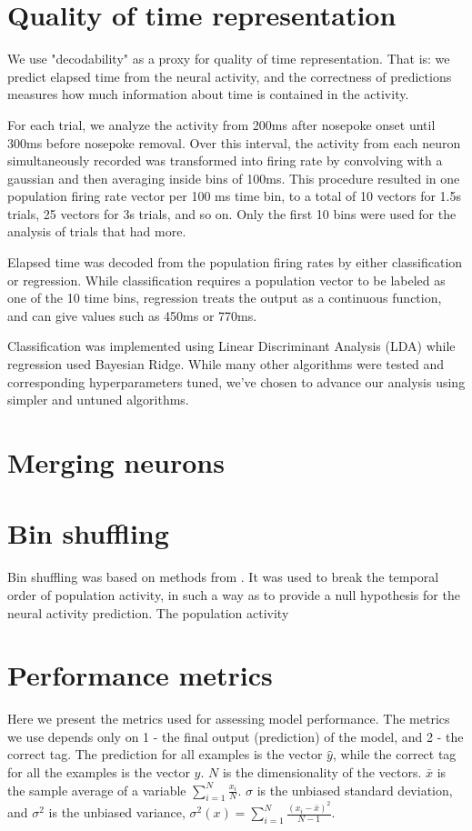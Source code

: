 \section{Quality of time representation}

    We use "decodability" as a proxy for quality of time representation. That is: we predict elapsed time from the neural activity, and the correctness of predictions measures how much information about time is contained in the activity. 
    
    For each trial, we analyze the activity from 200ms after nosepoke onset until 300ms before nosepoke removal. Over this interval, the activity from each neuron simultaneously recorded was transformed into firing rate by convolving with a gaussian and then averaging inside bins of 100ms. This procedure resulted in one population firing rate vector per 100 ms time bin, to a total of 10 vectors for 1.5s trials, 25 vectors for 3s trials, and so on. Only the first 10 bins were used for the analysis of trials that had more. 
    
    Elapsed time was decoded from the population firing rates by either classification or regression. While classification requires a population vector to be labeled as one of the 10 time bins, regression treats the output as a continuous function, and can give values such as 450ms or 770ms. 

    Classification was implemented using Linear Discriminant Analysis (LDA) while regression used Bayesian Ridge. While many other algorithms were tested and corresponding hyperparameters tuned, we've chosen to advance our analysis using simpler and untuned algorithms. 

\section{Merging neurons}
    
\section{Bin shuffling}
    Bin shuffling was based on methods from \cite{bakhurin2017differential}. It was used to break the temporal order of population activity, in such a way as to provide a null hypothesis for the neural activity prediction. The population activity 
    

\section{Performance metrics}
    Here we present the metrics used for assessing model performance. The metrics we use depends only on 1 - the final output (prediction) of the model, and 2 - the correct tag. The prediction for all examples is the vector $\hat{y}$, while the correct tag for all the examples is the vector $y$. $N$ is the dimensionality of the vectors. $\bar{x}$ is the sample average of a variable $\sum_{i=1}^N{\frac{x_i}{N}}$. $\sigma$ is the unbiased standard deviation, and $\sigma^2$ is the unbiased variance, $\sigma^2(x) = \sum_{i=1}^N{\frac{(x_i - \bar x)^2}{N - 1}}$.
    
